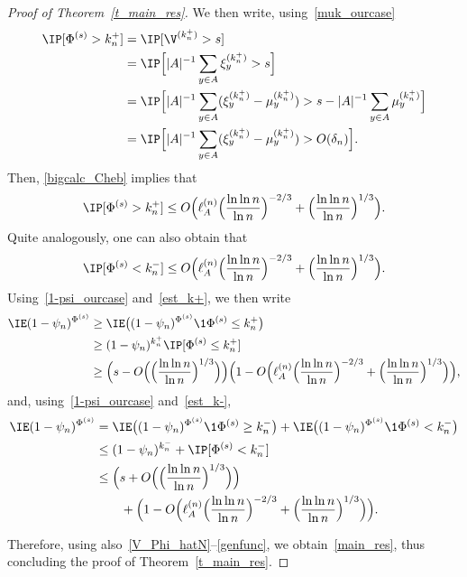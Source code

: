 \begin{proof}[Proof of Theorem~\ref{t_main_res}]
We then write, using~\eqref{muk_ourcase}
\begin{align}
\IP[\Phi^{(s)} > k_n^{+}] &= \IP[\V^{(k_n^{+})}>s]\nonumber\\
&= \IP\Big[|A|^{-1}\sum_{y\in A}\xi_y^{(k_n^{+})}> s\Big]\nonumber\\
&= \IP\Big[|A|^{-1}\sum_{y\in A}(\xi_y^{(k_n^{+})} -\mu_y^{(k_n^{+})})> s - |A|^{-1}\sum_{y\in A}\mu_y^{(k_n^{+})}\Big]\nonumber\\
&= \IP\Big[|A|^{-1}\sum_{y\in A}(\xi_y^{(k_n^{+})} -\mu_y^{(k_n^{+})})> O(\delta_n)
\Big].\label{Cheb+}
\end{align}
Then, \eqref{bigcalc_Cheb} implies that
\begin{equation}\label{est_k+}
\IP[\Phi^{(s)} > k_n^{+}]
\leq O\Big(\ell^{(n)}_A\Big(\frac{\ln\ln n}{\ln n}\Big)^{-2/3} + \Big(\frac{\ln\ln n}{\ln n}\Big)^{1/3} \Big).
\end{equation}
Quite analogously, one can also obtain that
\begin{equation}\label{est_k-}
\IP[\Phi^{(s)} < k_n^{-}]
\leq O\Big(\ell^{(n)}_A\Big(\frac{\ln\ln n}{\ln n}\Big)^{-2/3} + \Big(\frac{\ln\ln n}{\ln n}\Big)^{1/3} \Big).
\end{equation}
Using~\eqref{1-psi_ourcase} and~\eqref{est_k+}, we then write
\begin{align}
\IE (1-\psi_n)^{\Phi^{(s)}} &\geq
\IE \big((1-\psi_n)^{\Phi^{(s)}}\1{\Phi^{(s)} \leq k_n^{+}}\big)
\nonumber\\
&\geq (1-\psi_n)^{k_n^{+}}
\IP[\Phi^{(s)} \leq k_n^{+}]\nonumber\\
&\geq \Big(s-O\Big(\Big(\frac{\ln\ln n}{\ln n}\Big)^{1/3}\Big)\Big)
\Big(1-O\Big(\ell^{(n)}_A\Big(\frac{\ln\ln n}{\ln n}\Big)^{-2/3} + \Big(\frac{\ln\ln n}{\ln n}\Big)^{1/3} \Big)\Big),\label{bigest>}
\end{align}
and, using~\eqref{1-psi_ourcase} and~\eqref{est_k-},
\begin{align}
\IE (1-\psi_n)^{\Phi^{(s)}} &=
\IE \big((1-\psi_n)^{\Phi^{(s)}}\1{\Phi^{(s)} \geq k_n^{-}}\big) + \IE \big((1-\psi_n)^{\Phi^{(s)}}\1{\Phi^{(s)} < k_n^{-}}\big)
\nonumber\\
&\leq (1-\psi_n)^{k_n^{-}} + \IP[\Phi^{(s)} < k_n^{-}]
\nonumber\\
&\leq \Big(s+O\Big(\Big(\frac{\ln\ln n}{\ln n}\Big)^{1/3}\Big)\Big)
\nonumber\\
& \qquad +
\Big(1-O\Big(\ell^{(n)}_A\Big(\frac{\ln\ln n}{\ln n}\Big)^{-2/3} + \Big(\frac{\ln\ln n}{\ln n}\Big)^{1/3} \Big)\Big).\label{bigest<}
\end{align}


Therefore, using also~\eqref{V_Phi_hatN}--\eqref{genfunc}, we obtain~\eqref{main_res}, thus concluding the proof of Theorem~\ref{t_main_res}.
\end{proof}

